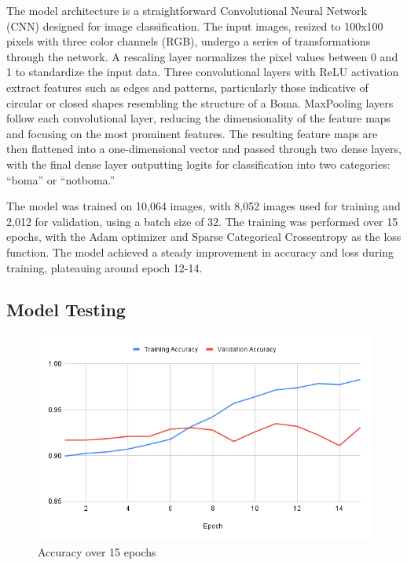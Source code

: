 \documentclass[10pt]{article}
\begin{document}
The model architecture is a straightforward Convolutional Neural Network (CNN) designed for image classification. The input images, resized to 100x100 pixels with three color channels (RGB), undergo a series of transformations through the network. A rescaling layer normalizes the pixel values between 0 and 1 to standardize the input data. Three convolutional layers with ReLU activation extract features such as edges and patterns, particularly those indicative of circular or closed shapes resembling the structure of a Boma. MaxPooling layers follow each convolutional layer, reducing the dimensionality of the feature maps and focusing on the most prominent features. The resulting feature maps are then flattened into a one-dimensional vector and passed through two dense layers, with the final dense layer outputting logits for classification into two categories: “boma” or “notboma.”

The model was trained on 10,064 images, with 8,052 images used for training and 2,012 for validation, using a batch size of 32. The training was performed over 15 epochs, with the Adam optimizer and Sparse Categorical Crossentropy as the loss function. The model achieved a steady improvement in accuracy and loss during training, plateauing around epoch 12-14.

\subsection{Model Testing}

\begin{figure} [H]
    \centering
    \includegraphics[width=1\linewidth]{images/Training Accuracy.png}
    \caption{Accuracy over 15 epochs}
    \label{fig:Accuracy_Chart}
\end{figure}
\end{document}

